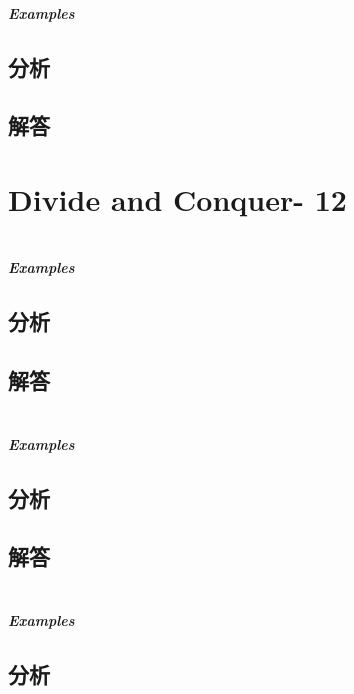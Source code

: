 \documentclass[UTF8,a4paper,12pt]{ctexbook}
\begin{document}
	\subparagraph{Examples}
	
	\subsection{分析}
	
	\subsection{解答}
\section{Divide and Conquer- 12}
\section{}
	
	\subparagraph{Examples}
	
	\subsection{分析}
	
	\subsection{解答}
	
\section{}
	
	\subparagraph{Examples}
	
	\subsection{分析}
	
	\subsection{解答}
	
	
\section{}
	
	\subparagraph{Examples}
	
	\subsection{分析}
	
\end{document}
